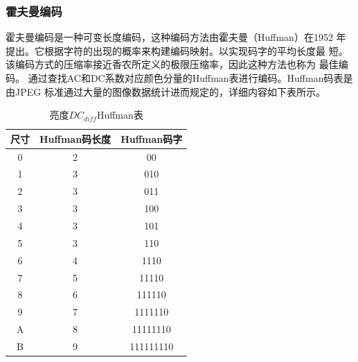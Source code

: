 \documentclass{article}
\numberwithin {equation}{section}
\begin{document}
\begin{spacing}{1.25}
    \subsubsection{霍夫曼编码}
      \vspace{1em}
      霍夫曼编码是一种可变长度编码，这种编码方法由霍夫曼（Huffman）在1952
      年提出。它根据字符的出现的概率来构建编码映射。以实现码字的平均长度最
      短。该编码方式的压缩率接近香农所定义的极限压缩率，因此这种方法也称为
      最佳编码。
      通过查找AC和DC系数对应颜色分量的Huffman表进行编码。Huffman码表是由JPEG
      标准通过大量的图像数据统计进而规定的，详细内容如下表所示。
      \begin{table}[H]
        \centering
        \caption{亮度$DC_{diff}$Huffman表}
        \begin{tabular}{ccc}
          \toprule
          尺寸  & Huffman码长度 & Huffman码字\\
          \midrule
          0     & 2             & 00\\
          1     & 3             & 010\\
          2     & 3             & 011\\
          3     & 3             & 100\\
          4     & 3             & 101\\
          5     & 3             & 110\\
          6     & 4             & 1110\\
          7     & 5             & 11110\\
          8     & 6             & 111110\\
          9     & 7             & 1111110\\
          A     & 8             & 11111110\\
          B     & 9             & 111111110\\
          \bottomrule
        \end{tabular}
      \end{table}


\end{spacing}
\end{document}
